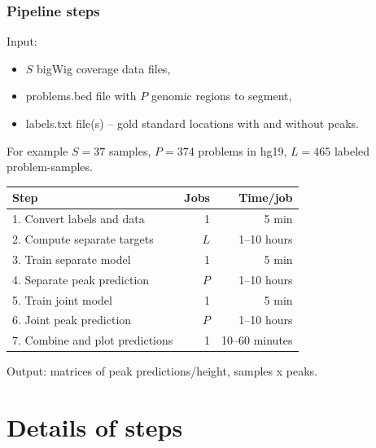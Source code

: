 \documentclass{beamer}
\begin{document}

\begin{frame}
  \frametitle{Pipeline steps}
Input:
\begin{itemize}
\item $S$ bigWig coverage data files, 
\item problems.bed file with $P$ genomic regions to segment, 
\item labels.txt file(s) -- gold standard locations with and without peaks.
\end{itemize}
For example $S=37$ samples, $P=374$ problems in hg19, $L=465$ labeled
problem-samples.
  \vskip 0.2cm
  \begin{tabular}{lrr}
    Step& Jobs& Time/job \\
    \hline
    1. Convert labels and data & 1 & 5 min\\
    2. Compute separate targets & $L$ & 1--10 hours\\
    3. Train separate model & 1 & 5 min \\
    4. Separate peak prediction & $P$ & 1--10 hours\\
    5. Train joint model & 1 & 5 min \\
    6. Joint peak prediction & $P$ & 1--10 hours\\
    7. Combine and plot predictions & 1 & 10--60 minutes
  \end{tabular}
\vskip 0.2cm
Output: matrices of peak predictions/height, samples x peaks.
\end{frame}

\section{Details of steps}
\end{document}
